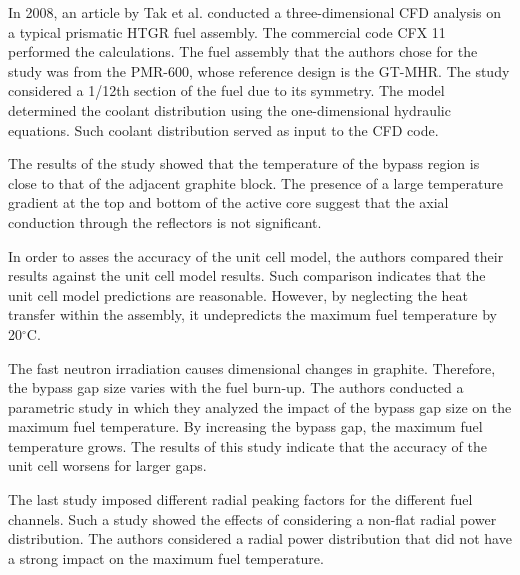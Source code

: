 \documentclass[11pt,letterpaper]{article}
\begin{document}
In 2008, an article by Tak et al. \cite{tak_numerical_2008} conducted  a three-dimensional \gls{CFD} analysis on a typical prismatic HTGR fuel assembly.
The commercial code CFX 11 \cite{ansys_incorporated_cfx_2006} performed the calculations.
The fuel assembly that the authors chose for the study was from the PMR-600, whose reference design is the GT-MHR.
The study considered a 1/12th section of the fuel due to its symmetry.
The model determined the coolant distribution using the one-dimensional hydraulic equations.
Such coolant distribution served as input to the CFD code.

The results of the study showed that the temperature of the bypass region is close to that of the adjacent graphite block.
The presence of a large temperature gradient at the top and bottom of the active core suggest that the axial conduction through the reflectors is not significant.

In order to asses the accuracy of the unit cell model, the authors compared their results against the unit cell model results.
Such comparison indicates that the unit cell model predictions are reasonable.
However, by neglecting the heat transfer within the assembly, it undepredicts the maximum fuel temperature by 20$^{\circ}$C.

The fast neutron irradiation causes dimensional changes in graphite.
Therefore, the bypass gap size varies with the fuel burn-up.
The authors conducted a parametric study in which they analyzed the impact of the bypass gap size on the maximum fuel temperature.
By increasing the bypass gap, the maximum fuel temperature grows.
The results of this study indicate that the accuracy of the unit cell worsens for larger gaps.

The last study imposed different radial peaking factors for the different fuel channels.
Such a study showed the effects of considering a non-flat radial power distribution.
The authors considered a radial power distribution that did not have a strong impact on the maximum fuel temperature.
\end{document}

